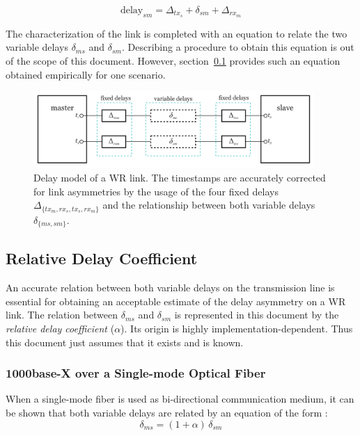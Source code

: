 \documentclass[a4paper, 12pt]{article}
\newcommand{\eqdelay}[1]{{\text{delay}}_{#1}}
\begin{document}
\begin{equation}
  \label{eq:delaysm}
  \eqdelay{sm} = \Delta_{tx_s} + \delta_{sm} + \Delta_{rx_m}
\end{equation}

The characterization of the link is completed with an equation to
relate the two variable delays $\delta_{ms}$ and $\delta_{sm}$.
Describing a procedure to obtain this equation is out of the scope of this document. However, 
section~\ref{sec:physcorr} provides such an equation obtained empirically for one scenario.

\begin{figure}[ht!]
  \centering
    \includegraphics[width=0.95\textwidth]{protocol/delaymodel.pdf}
  \caption{Delay model of a WR link. The timestamps are accurately corrected
    for link asymmetries by the usage of the four fixed delays
    $\Delta_{\{tx_m, rx_s, tx_s, rx_m\}}$ and the relationship
    between both variable delays $\delta_{\{ms, sm\}}$. }
  \label{fig:delaymodel}
\end{figure}

\subsection{Relative Delay Coefficient}
\label{sec:physcorr}

An accurate relation between both variable delays on the transmission line
is essential for obtaining an acceptable estimate of the delay asymmetry on a
WR link. The relation between $\delta_{ms}$ and $\delta_{sm}$ is represented in 
this document by the \textit{relative delay coefficient} ($\alpha$).
Its origin is highly implementation-dependent. Thus this document just assumes that it exists 
and is known. 

\subsubsection{1000base-X over a Single-mode Optical Fiber}
\label{sec:singlefiber}
When a single-mode fiber is used as bi-directional communication medium,
it can be shown that both variable delays are related by an equation of
the form \cite{Peek2010}:
\begin{equation}
\delta_{ms} = (1 + \alpha) \, \delta_{sm}
\label{eq:singlefiber}
\end{equation}
\end{document}
